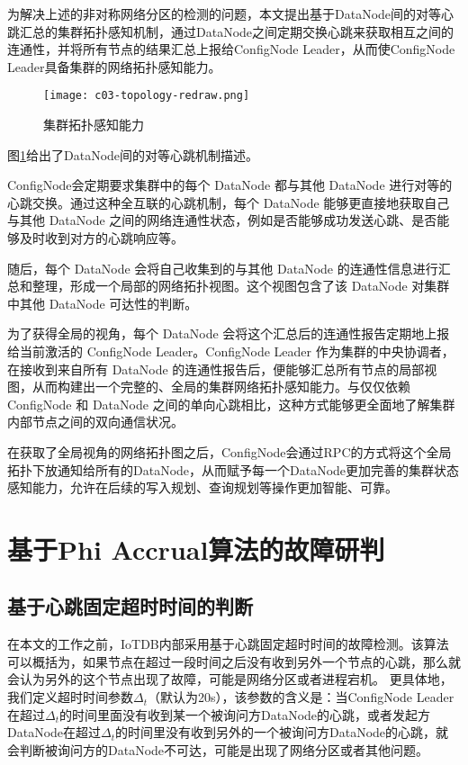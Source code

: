 为解决上述的非对称网络分区的检测的问题，本文提出基于DataNode间的对等心跳汇总的集群拓扑感知机制，通过DataNode之间定期交换心跳来获取相互之间的连通性，并将所有节点的结果汇总上报给ConfigNode Leader，从而使ConfigNode Leader具备集群的网络拓扑感知能力。

\begin{figure}
  \centering
  \texttt{[image: c03-topology-redraw.png]}
  \caption{集群拓扑感知能力}
  \label{fig:c03-topology}
\end{figure}

图\ref{fig:c03-topology}给出了DataNode间的对等心跳机制描述。

ConfigNode会定期要求集群中的每个 DataNode 都与其他 DataNode 进行对等的心跳交换。通过这种全互联的心跳机制，每个 DataNode 能够更直接地获取自己与其他 DataNode 之间的网络连通性状态，例如是否能够成功发送心跳、是否能够及时收到对方的心跳响应等。

随后，每个 DataNode 会将自己收集到的与其他 DataNode 的连通性信息进行汇总和整理，形成一个局部的网络拓扑视图。这个视图包含了该 DataNode 对集群中其他 DataNode 可达性的判断。

为了获得全局的视角，每个 DataNode 会将这个汇总后的连通性报告定期地上报给当前激活的 ConfigNode Leader。ConfigNode Leader 作为集群的中央协调者，在接收到来自所有 DataNode 的连通性报告后，便能够汇总所有节点的局部视图，从而构建出一个完整的、全局的集群网络拓扑感知能力。与仅仅依赖 ConfigNode 和 DataNode 之间的单向心跳相比，这种方式能够更全面地了解集群内部节点之间的双向通信状况。

在获取了全局视角的网络拓扑图之后，ConfigNode会通过RPC的方式将这个全局拓扑下放通知给所有的DataNode，从而赋予每一个DataNode更加完善的集群状态感知能力，允许在后续的写入规划、查询规划等操作更加智能、可靠。


\section{基于Phi Accrual算法的故障研判}\label{failure_detection}

\subsection{基于心跳固定超时时间的判断}\label{failure_detection_timeout_fix}

在本文的工作之前，IoTDB内部采用基于心跳固定超时时间的故障检测。该算法可以概括为，如果节点在超过一段时间之后没有收到另外一个节点的心跳，那么就会认为另外的这个节点出现了故障，可能是网络分区或者进程宕机。
更具体地，我们定义超时时间参数$\Delta_{t}$（默认为20s），该参数的含义是：当ConfigNode Leader在超过$\Delta_{t}$的时间里面没有收到某一个被询问方DataNode的心跳，或者发起方DataNode在超过$\Delta_{t}$的时间里没有收到另外的一个被询问方DataNode的心跳，就会判断被询问方的DataNode不可达，可能是出现了网络分区或者其他问题。

